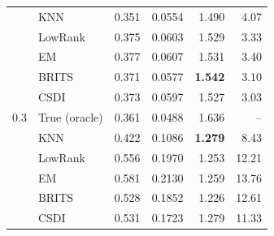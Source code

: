 \begin{table}[htbp]
\begin{tabular}{llrrrr}
     & KNN & 0.351 & 0.0554 & 1.490 & 4.07 \\
     & LowRank & 0.375 & 0.0603 & 1.529 & 3.33 \\
     & EM & 0.377 & 0.0607 & 1.531 & 3.40 \\
     & BRITS & 0.371 & 0.0577 & \textbf{1.542} & 3.10 \\
     & CSDI & 0.373 & 0.0597 & 1.527 & 3.03 \\
    \midrule
    $0.3$ & True (oracle) & 0.361 & 0.0488 & 1.636 & -- \\
     & KNN & 0.422 & 0.1086 & \textbf{1.279} & 8.43 \\
     & LowRank & 0.556 & 0.1970 & 1.253 & 12.21 \\
     & EM & 0.581 & 0.2130 & 1.259 & 13.76 \\
     & BRITS & 0.528 & 0.1852 & 1.226 & 12.61 \\
     & CSDI & 0.531 & 0.1723 & 1.279 & 11.33 \\
    \bottomrule
  \end{tabular}
\end{table}

